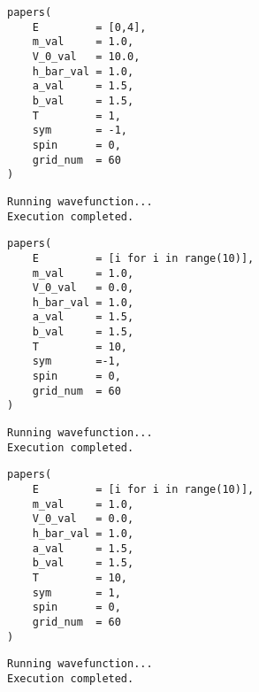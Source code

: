 \documentclass[11pt]{article}
\begin{document}
\begin{verbatim}
papers(
    E         = [0,4],
    m_val     = 1.0,
    V_0_val   = 10.0,
    h_bar_val = 1.0,
    a_val     = 1.5,
    b_val     = 1.5,
    T         = 1,
    sym       = -1,
    spin      = 0,
    grid_num  = 60
)
\end{verbatim}

\label{orgee97f2c}
\begin{verbatim}
Running wavefunction...
Execution completed.
\end{verbatim}

\begin{center}

\end{center}

\begin{verbatim}
papers(
    E         = [i for i in range(10)],
    m_val     = 1.0,
    V_0_val   = 0.0,
    h_bar_val = 1.0,
    a_val     = 1.5,
    b_val     = 1.5,
    T         = 10,
    sym       =-1,
    spin      = 0,
    grid_num  = 60
)
\end{verbatim}

\label{org4b1bbc5}
\begin{verbatim}
Running wavefunction...
Execution completed.
\end{verbatim}

\begin{center}

\end{center}

\begin{verbatim}
papers(
    E         = [i for i in range(10)],
    m_val     = 1.0,
    V_0_val   = 0.0,
    h_bar_val = 1.0,
    a_val     = 1.5,
    b_val     = 1.5,
    T         = 10,
    sym       = 1,
    spin      = 0,
    grid_num  = 60
)
\end{verbatim}

\label{org9a7e9ef}
\begin{verbatim}
Running wavefunction...
Execution completed.
\end{verbatim}

\begin{center}

\end{center}
\end{document}
